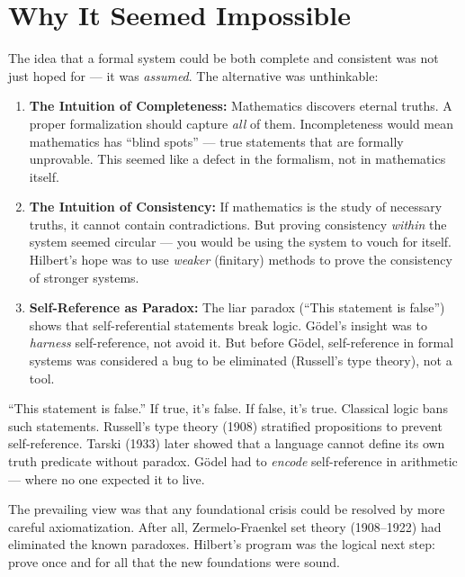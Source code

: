 \section{Why It Seemed Impossible}
\label{sec:godel:impossible}

The idea that a formal system could be both complete and consistent was not just hoped for --- it was \emph{assumed}. The alternative was unthinkable:

\begin{enumerate}
\item \textbf{The Intuition of Completeness:} Mathematics discovers eternal truths. A proper formalization should capture \emph{all} of them. Incompleteness would mean mathematics has ``blind spots'' --- true statements that are formally unprovable. This seemed like a defect in the formalism, not in mathematics itself.

\item \textbf{The Intuition of Consistency:} If mathematics is the study of necessary truths, it cannot contain contradictions. But proving consistency \emph{within} the system seemed circular --- you would be using the system to vouch for itself. Hilbert's hope was to use \emph{weaker} (finitary) methods to prove the consistency of stronger systems.

\item \textbf{Self-Reference as Paradox:} The liar paradox (``This statement is false'') shows that self-referential statements break logic. Gödel's insight was to \emph{harness} self-reference, not avoid it. But before Gödel, self-reference in formal systems was considered a bug to be eliminated (Russell's type theory), not a tool.
\end{enumerate}

``This statement is false.'' If true, it's false. If false, it's true. Classical logic bans such statements. Russell's type theory (1908) stratified propositions to prevent self-reference. Tarski (1933) later showed that a language cannot define its own truth predicate without paradox. Gödel had to \emph{encode} self-reference in arithmetic --- where no one expected it to live.

The prevailing view was that any foundational crisis could be resolved by more careful axiomatization. After all, Zermelo-Fraenkel set theory (1908--1922) had eliminated the known paradoxes. Hilbert's program was the logical next step: prove once and for all that the new foundations were sound.


